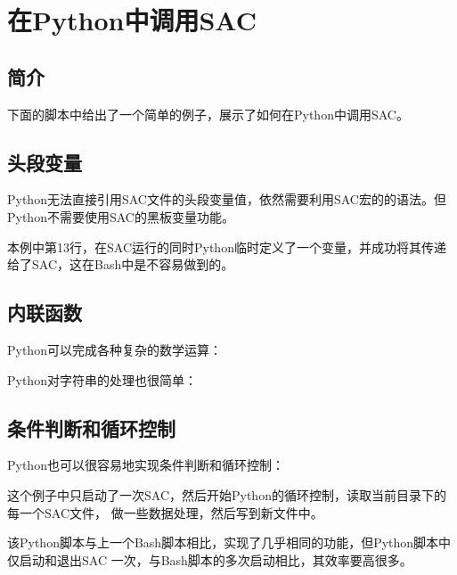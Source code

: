 \section{在Python中调用SAC}
\label{sec:sac-python}

\subsection{简介}
下面的脚本中给出了一个简单的例子，展示了如何在Python中调用SAC。


\subsection{头段变量}
Python无法直接引用SAC文件的头段变量值，依然需要利用SAC宏的的语法。但Python不需要使用SAC的黑板变量功能。

本例中第13行，在SAC运行的同时Python临时定义了一个变量，并成功将其传递给了SAC，这在Bash中是不容易做到的。

\subsection{内联函数}
Python可以完成各种复杂的数学运算：


Python对字符串的处理也很简单：


\subsection{条件判断和循环控制}
Python也可以很容易地实现条件判断和循环控制：

这个例子中只启动了一次SAC，然后开始Python的循环控制，读取当前目录下的每一个SAC文件，
做一些数据处理，然后写到新文件中。

该Python脚本与上一个Bash脚本相比，实现了几乎相同的功能，但Python脚本中仅启动和退出SAC
一次，与Bash脚本的多次启动相比，其效率要高很多。
